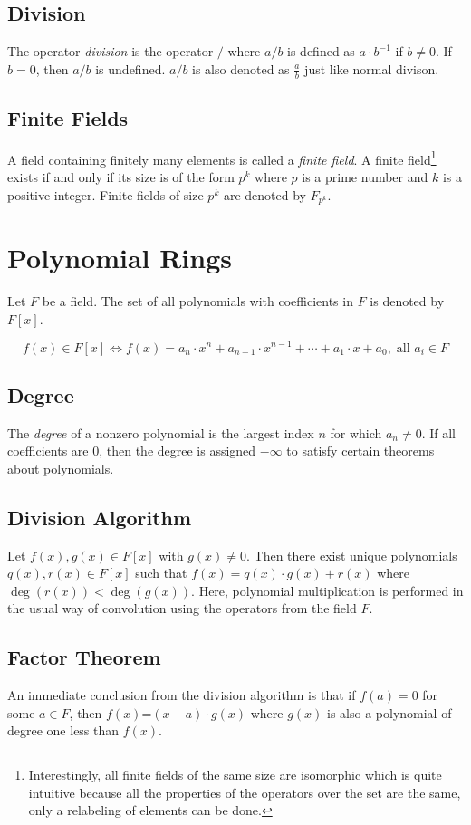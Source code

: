 \subsection{Division}
The operator \emph{division} is the operator $/$ where $a/b$ is defined as $a \cdot b^{-1}$ 
if $b\neq 0$. If $b=0$, then $a/b$ is undefined. $a/b$ is also denoted as $\frac{a}{b}$ just like 
normal divison. 

\subsection{Finite Fields}
A field containing finitely many elements is called a \emph{finite field}. A finite 
field\footnote{Interestingly, all finite fields of the same size are isomorphic which is quite 
intuitive because all the properties of the operators over the set are the same, only a relabeling 
of elements can be done.} exists if and only if its size is of the form $p^k$ 
where $p$ is a prime number and $k$ is a positive integer. Finite fields of size $p^k$ are denoted 
by $F_{p^k}$. 

\section{Polynomial Rings}
Let $F$ be a field. The set of all polynomials with coefficients in $F$ is denoted by $F[x]$.

\[
f(x) \in F[x] \iff f(x)=a_n\cdot x^n+a_{n-1} \cdot x^{n-1}+\cdots+a_1\cdot x+a_0, \;\text{all }a_i \in F
\]

\subsection{Degree}
The \emph{degree} of a nonzero polynomial is the largest index $n$ for which $a_n\neq0$. If all coefficients 
are $0$, then the degree is assigned $-\infty$ to satisfy certain theorems about polynomials.

\subsection{Division Algorithm}
Let $f(x),g(x)\in F[x]$ with $g(x)\neq0$. Then there exist unique polynomials $q(x),r(x)\in F[x]$ 
such that $f(x)=q(x)\cdot g(x)+r(x)$ where $\deg(r(x))<\deg(g(x))$. Here, polynomial multiplication is 
performed in the usual way of convolution using the operators from the field $F$.

\subsection{Factor Theorem}
An immediate conclusion from the division algorithm is that if $f(a)=0$ for some $a\in F$, then 
$f(x)$=$(x-a)\cdot g(x)$ where $g(x)$ is also a polynomial of degree one less than $f(x)$. 

